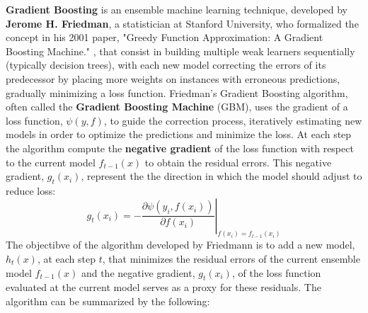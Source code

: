 \textbf{Gradient Boosting} is an ensemble machine learning technique, developed by \textbf{Jerome H. Friedman}, a statistician at Stanford University, who formalized the concept in his 2001 paper, "Greedy Function Approximation: A Gradient Boosting Machine." \cite{Friedman2001}, that consist in building multiple weak learners sequentially (typically decision trees), with each new model correcting the errors of its predecessor by placing more weights on instances with erroneous predictions, gradually minimizing a loss function. Friedman’s Gradient Boosting algorithm, often called the \textbf{Gradient Boosting Machine} (GBM), uses the gradient of a loss function, $\psi(y, f)$, to guide the correction process, iteratively estimating new models in order to optimize the predictions and minimize the loss. At each step the algorithm compute the \textbf{negative gradient} of the loss function with respect to the current model $f_{t-1}(x)$ to obtain the residual errors. This negative gradient, $g_t(x_i)$, represent the the direction in which the model should adjust to reduce loss:
\[
    g_t(x_i) = -\left.\frac{\partial \psi(y_i, f(x_i))}{\partial f(x_i)}\right|_{f(x_i) = f_{t-1}(x_i)}
\]
The objectibve of the algorithm developed by Friedmann is to add a new model, $h_t(x)$, at each step $t$, that minimizes the residual errors of the current ensemble model $f_{t-1}(x)$ and the negative gradient,  $g_t(x_i)$, of the loss function evaluated at the current model serves as a proxy for these residuals. The algorithm can be summarized by the following:

